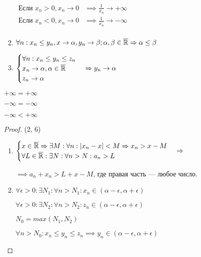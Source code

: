 \begin{properties}
\begin{enumerate}
        $\begin{aligned}
            \text{Если } x_n > 0, x_n \to 0 & \implies \frac{1}{x_n} \to +\infty \\
            \text{Если } x_n < 0, x_n \to 0 & \implies \frac{1}{x_n} \to -\infty \\
        \end{aligned}$
        \item $\forall n: x_n \leq y_n, x \to \alpha, y_n \to \beta; \alpha, \beta \in \overline {\mathbb{R}} \Rightarrow \alpha \leq \beta$
        \item $\begin{cases}
            \forall n: x_n \leq y_n \leq z_n \\
            x_n \to \alpha, \alpha \in \overline{\mathbb{R}}\\
            z_n \to \alpha \\
        \end{cases} \Rightarrow y_n \to \alpha$
    \end{enumerate}
\end{properties}

\begin{remark}
    
    $+\infty = +\infty$

    $-\infty = -\infty$

    $-\infty < +\infty$
\end{remark}

\begin{proof} (2, 6)
    \begin{enumerate}
        \item[2] 
        $\begin{cases}
            x \in \overline{\mathbb{R}} \Rightarrow \exists M: \forall n: |x_n - x| < M \Rightarrow x_n > x - M \\
            \forall L \in \overline{\mathbb{R}}: \exists N: \forall n > N: a_n > L
        \end{cases} \Rightarrow$
        
        $\implies a_n + x_n > L + x - M$, где правая часть --- любое число.

        
        
        \item[6] $\forall \epsilon > 0: \exists N_1: \forall n > N_1: x_n \in (\alpha - \epsilon, \alpha + \epsilon)$

        $\forall \epsilon > 0: \exists N_2: \forall n > N_2: z_n \in (\alpha - \epsilon, \alpha + \epsilon)$

        $N_0 = max(N_1, N_2)$

        $\forall n > N_0: x_n \leq y_n \leq z_n \implies y_n \in (\alpha - \epsilon, \alpha + \epsilon)$
    \end{enumerate}
\end{proof}

